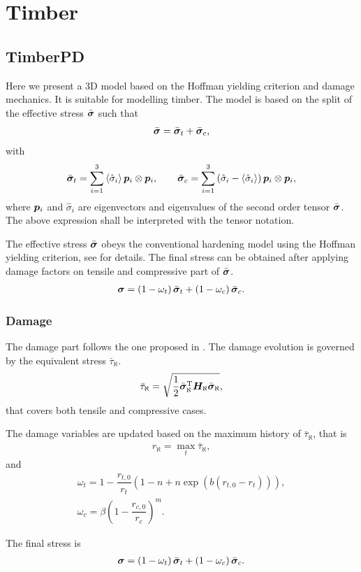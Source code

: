 \chapter{Timber}
\section{TimberPD}
Here we present a 3D model based on the Hoffman yielding criterion and damage mechanics. It is suitable for modelling timber. The model is based on the split of the effective stress $\bar{\bm{\sigma}}$ such that
\begin{gather}
\bar{\bm{\sigma}}=\bar{\bm{\sigma}}_t+\bar{\bm{\sigma}}_c,
\end{gather}
with
\begin{gather}
\bar{\bm{\sigma}}_t=\sum_{i=1}^{3}\left\langle\hat{\sigma}_i\right\rangle\bm{p}_i\otimes\bm{p}_i,\qquad
\bar{\bm{\sigma}}_c=\sum_{i=1}^{3}\left(\hat{\sigma}_i-\left\langle\hat{\sigma}_i\right\rangle\right)\bm{p}_i\otimes\bm{p}_i,
\end{gather}
where $\bm{p}_i$ and $\hat{\sigma}_i$ are eigenvectors and eigenvalues of the second order tensor $\bar{\bm{\sigma}}$. The above expression shall be interpreted with the tensor notation.

The effective stress $\bar{\bm{\sigma}}$ obeys the conventional hardening model using the Hoffman yielding criterion, see  for details. The final stress can be obtained after applying damage factors on tensile and compressive part of $\bar{\bm{\sigma}}$.
\begin{gather}
\bm{\sigma}=\left(1-\omega_t\right)\bar{\bm{\sigma}}_t+\left(1-\omega_c\right)\bar{\bm{\sigma}}_c.
\end{gather}
\subsection{Damage}
The damage part follows the one proposed in \cite{SirumbalZapata2018}. The damage evolution is governed by the equivalent stress $\bar{\tau}_{\aleph}$.
\begin{gather}
\bar{\tau}_{\aleph}=\sqrt{\dfrac{1}{2}\bar{\bm{\sigma}}_\aleph^{\mathrm{T}}\bm{H}_\aleph\bar{\bm{\sigma}}_\aleph},
\end{gather}
that covers both tensile and compressive cases.

The damage variables are updated based on the maximum history of $\bar{\tau}_{\aleph}$, that is
\begin{gather}
r_\aleph=\max_t\bar{\tau}_{\aleph},
\end{gather}
and
\begin{gather}
\omega_t=1-\dfrac{r_{t,0}}{r_t}\left(1-n+n\exp\left(b\left(r_{t,0}-r_t\right)\right)\right),\\
\omega_c=\beta\left(1-\dfrac{r_{c,0}}{r_c}\right)^m.
\end{gather}

The final stress is
\begin{gather}
\bm{\sigma}=\left(1-\omega_t\right)\bar{\bm{\sigma}}_t+\left(1-\omega_c\right)\bar{\bm{\sigma}}_c.
\end{gather}
